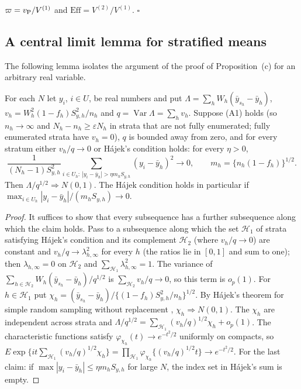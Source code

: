 $\varpi=v_{\rm P}/V^{(1)}$ and $\mathrm{Eff}=V^{(2)}/V^{(1)}$. $\square$

\subsection{A central limit lemma for stratified means}\label{si:testing-clt}

The following lemma isolates the argument of the proof of Proposition~(c) for an arbitrary real variable.

\begin{lemma}\label{lem:strat-clt}
For each $N$ let $y_i$, $i\in U$, be real numbers and put $\Lambda=\sum_hW_h(\bar y_{s_h}-\bar y_h)$, $v_h=W_h^2(1-f_h)S^2_{y,h}/n_h$ and $q=\operatorname{Var}\Lambda=\sum_hv_h$. Suppose (A1) holds (so $n_h\to\infty$ and $N_h-n_h\ge\varepsilon N_h$ in strata that are not fully enumerated; fully enumerated strata have $v_h=0$), $q$ is bounded away from zero, and for every stratum either $v_h/q\to0$ or Hájek's condition holds: for every $\eta>0$,
\[
\frac{1}{(N_h-1)S^2_{y,h}}\sum_{i\in U_h:\ |y_i-\bar y_h|>\eta m_hS_{y,h}}(y_i-\bar y_h)^2\to0,\qquad m_h=\{n_h(1-f_h)\}^{1/2}.
\]
Then $\Lambda/q^{1/2}\Rightarrow N(0,1)$. The Hájek condition holds in particular if $\max_{i\in U_h}|y_i-\bar y_h|/(m_hS_{y,h})\to0$.
\end{lemma}
\begin{proof}
It suffices to show that every subsequence has a further subsequence along which the claim holds. Pass to a subsequence along which the set $\mathcal H_1$ of strata satisfying Hájek's condition and its complement $\mathcal H_2$ (where $v_h/q\to0$) are constant and $v_h/q\to\lambda_{h,\infty}^2$ for every $h$ (the ratios lie in $[0,1]$ and sum to one); then $\lambda_{h,\infty}=0$ on $\mathcal H_2$ and $\sum_{\mathcal H_1}\lambda^2_{h,\infty}=1$. The variance of $\sum_{h\in\mathcal H_2}W_h(\bar y_{s_h}-\bar y_h)/q^{1/2}$ is $\sum_{\mathcal H_2}v_h/q\to0$, so this term is $o_p(1)$. For $h\in\mathcal H_1$ put $\chi_h=(\bar y_{s_h}-\bar y_h)/\{(1-f_h)S^2_{y,h}/n_h\}^{1/2}$. By Hájek's theorem for simple random sampling without replacement \citep{hajek1960}, $\chi_h\Rightarrow N(0,1)$. The $\chi_h$ are independent across strata and $\Lambda/q^{1/2}=\sum_{\mathcal H_1}(v_h/q)^{1/2}\chi_h+o_p(1)$. The characteristic functions satisfy $\varphi_{\chi_h}(t)\to e^{-t^2/2}$ uniformly on compacts, so
$E\exp\{it\sum_{\mathcal H_1}(v_h/q)^{1/2}\chi_h\}=\prod_{\mathcal H_1}\varphi_{\chi_h}\{(v_h/q)^{1/2}t\}\to e^{-t^2/2}$. For the last claim: if $\max|y_i-\bar y_h|\le\eta m_hS_{y,h}$ for large $N$, the index set in Hájek's sum is empty.
\end{proof}

